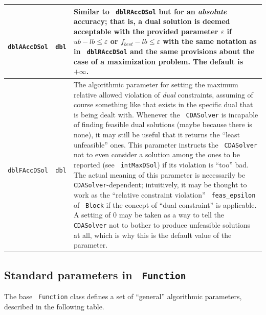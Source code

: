 \documentclass[a4paper]{article}
\newcommand{\code}[1]{\textrm{\texttt{\hyphenchar\font=200 #1}}}
\def\Block{\code{Block}\xspace}
\begin{document}
\begin{longtable}{|c|c|p{13.5cm}|}
 \hline
 \code{dblAAccDSol} & \code{dbl} & Similar to \code{dblRAccDSol} but for an \emph{absolute} accuracy; that is, a dual solution is deemed acceptable with the provided parameter $\varepsilon$ if $ub - lb \leq \varepsilon$ or $f_{best} - lb \leq \varepsilon$ with the same notation as in \code{dblRAccDSol} and the same provisions about the case of a maximization problem. The default is $+\infty$. \\
 \hline
 \code{dblFAccDSol} & \code{dbl} & The algorithmic parameter for setting the maximum relative allowed violation of \emph{dual} constraints, assuming of course something like that exists in the specific dual that is being dealt with. Whenever the \code{CDASolver} is incapable of finding feasible dual solutions (maybe because there is none), it may still be useful that it returns the ``least unfeasible'' ones. This parameter instructs the \code{CDASolver} not to even consider a solution among the ones to be reported (see \code{intMaxDSol}) if its violation is ``too'' bad. The actual meaning of this parameter is necessarily be \code{CDASolver}-dependent; intuitively, it may be thought to work as the ``relative constraint violation'' \code{feas\_epsilon} of \Block if the concept of ``dual constraint'' is applicable. A setting of $0$ may be taken as a way to tell the \code{CDASolver} not to bother to produce unfeasible solutions at all, which is why this is the default value of the parameter. \\
 \hline
\end{longtable}

\subsection{Standard parameters in \code{Function}}

The base \code{Function} class defines a set of ``general'' algorithmic parameters, described in the following table.
\end{document}
